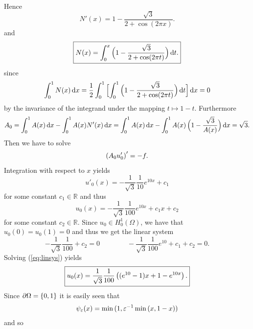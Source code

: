 \begin{example}
\begin{align*}
	\end{align*}
	Hence
	\begin{equation}
		\boxed{N'(x) = 1 - \frac{\sqrt{3}}{2 + \cos(2\pi x)}.}
	\end{equation}
	\noindent and
	\begin{equation}
		\boxed{N(x) = \int_0^x \del[2]{1 - \frac{\sqrt{3}}{2 + \cos(2\pi t)}} \d t.}
	\end{equation}
	\noindent since 
	\begin{equation}
	\int_0^1 N(x)\d x = \frac{1}{2}\int_0^1\sbr[2]{\int_0^1 \del[2]{1 - \frac{\sqrt{3}}{2 + \cos(2\pi t)}} \d t}\d x = 0
	\end{equation}
	\noindent by the invariance of the integrand under the mapping $t \mapsto 1 - t$. Furthermore
	\begin{equation*}
		A_0 = \int_0^1 A(x) \d x - \int_0^1 A(x)N'(x) \d x = \int_0^1 A(x) \d x - \int_0^1 A(x)\del[2]{1 - \frac{\sqrt{3}}{A(x)}} \d x = \sqrt{3}.
	\end{equation*}
	Then we have to solve
	\begin{equation}
		\del[0]{A_0u'_0}' = -f.
	\end{equation}
	Integration with respect to $x$ yields
	\begin{equation}
		u'_0(x) = -\frac{1}{\sqrt{3}}\frac{1}{10}e^{10x} + c_1
	\end{equation}
	\noindent for some constant $c_1 \in \mathbb{R}$ and thus 
	\begin{equation}
		u_0(x) = -\frac{1}{\sqrt{3}}\frac{1}{100}e^{10x} + c_1x + c_2
	\end{equation}
	\noindent for some constant $c_2 \in \mathbb{R}$. Since $u_0 \in H^1_0(\Omega)$, we have that $u_0(0) = u_0(1) = 0$ and thus we get the linear system
	\begin{equation}
		-\frac{1}{\sqrt{3}}\frac{1}{100} + c_2 = 0 \qquad\qquad  -\frac{1}{\sqrt{3}}\frac{1}{100}e^{10} + c_1 + c_2 = 0.
		\label{eq:linsys}
	\end{equation}
	\noindent Solving (\ref{eq:linsys}) yields
	\begin{equation}
		\boxed{u_0(x) = \frac{1}{\sqrt{3}}\frac{1}{100} \del[1]{(e^{10} - 1)x + 1 - e^{10x}}.}
	\end{equation}
	Since $\partial \Omega = \cbr[0]{0,1}$ it is easily seen that
	\begin{equation}
	\psi_\varepsilon(x) = \min\del[0]{1,\varepsilon^{-1}\min\del[0]{x,1 - x}}
	\end{equation}
	\noindent and so
	\begin{equation}

\end{equation}
\end{example}
